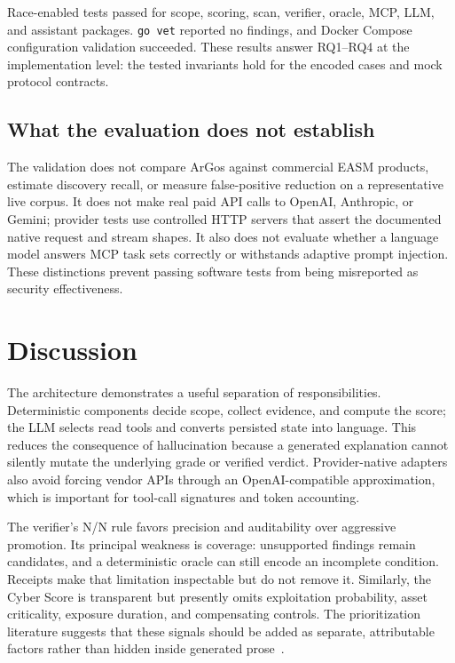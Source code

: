 \documentclass[conference,a4paper]{IEEEtran}
\newcommand{\argos}{ArGos\xspace}
\newcommand{\code}[1]{\texttt{#1}}
\begin{document}
Race-enabled tests passed for scope, scoring, scan, verifier, oracle, MCP, LLM, and assistant packages. \code{go vet} reported no findings, and Docker Compose configuration validation succeeded. These results answer RQ1--RQ4 at the implementation level: the tested invariants hold for the encoded cases and mock protocol contracts.

\subsection{What the evaluation does not establish}

The validation does not compare \argos against commercial EASM products, estimate discovery recall, or measure false-positive reduction on a representative live corpus. It does not make real paid API calls to OpenAI, Anthropic, or Gemini; provider tests use controlled HTTP servers that assert the documented native request and stream shapes. It also does not evaluate whether a language model answers MCP task sets correctly or withstands adaptive prompt injection. These distinctions prevent passing software tests from being misreported as security effectiveness.

\section{Discussion}

The architecture demonstrates a useful separation of responsibilities. Deterministic components decide scope, collect evidence, and compute the score; the LLM selects read tools and converts persisted state into language. This reduces the consequence of hallucination because a generated explanation cannot silently mutate the underlying grade or verified verdict. Provider-native adapters also avoid forcing vendor APIs through an OpenAI-compatible approximation, which is important for tool-call signatures and token accounting.

The verifier's N/N rule favors precision and auditability over aggressive promotion. Its principal weakness is coverage: unsupported findings remain candidates, and a deterministic oracle can still encode an incomplete condition. Receipts make that limitation inspectable but do not remove it. Similarly, the Cyber Score is transparent but presently omits exploitation probability, asset criticality, exposure duration, and compensating controls. The prioritization literature suggests that these signals should be added as separate, attributable factors rather than hidden inside generated prose~\cite{Jacobs2021EPSS,Jiang2025Prioritization,Shimizu2025Chaining}.
\end{document}
